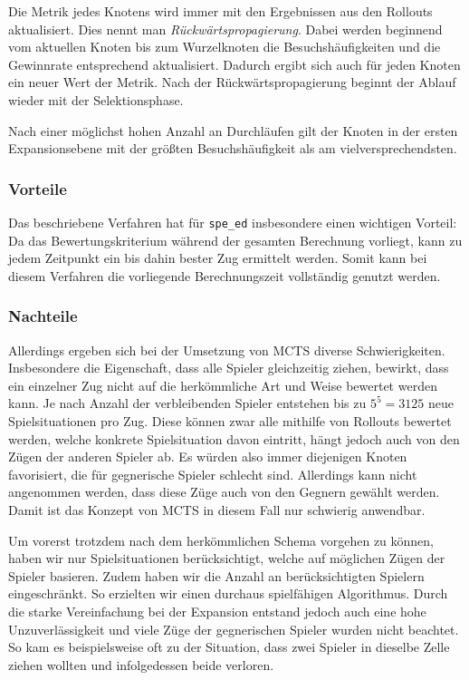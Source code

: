 \documentclass[12pt,a4paper]{article}
\begin{document}
Die Metrik jedes Knotens wird immer mit den Ergebnissen aus den Rollouts aktualisiert. Dies nennt man \textit{Rückwärtspropagierung}. Dabei werden beginnend vom aktuellen Knoten bis zum Wurzelknoten die Besuchshäufigkeiten und die Gewinnrate entsprechend aktualisiert. Dadurch ergibt sich auch für jeden Knoten ein neuer Wert der Metrik. Nach der Rückwärtspropagierung beginnt der Ablauf wieder mit der Selektionsphase.

Nach einer möglichst hohen Anzahl an Durchläufen gilt der Knoten in der ersten Expansionsebene mit der größten Besuchshäufigkeit als am vielversprechendsten.

\subsubsection{Vorteile}
Das beschriebene Verfahren hat für \texttt{spe\_ed} insbesondere einen wichtigen Vorteil: Da das Bewertungskriterium während der gesamten Berechnung vorliegt, kann zu jedem Zeitpunkt ein bis dahin bester Zug ermittelt werden. Somit kann bei diesem Verfahren die vorliegende Berechnungszeit vollständig genutzt werden.

\subsubsection{Nachteile}
Allerdings ergeben sich bei der Umsetzung von MCTS diverse Schwierigkeiten. Insbesondere die Eigenschaft, dass alle Spieler gleichzeitig ziehen, bewirkt, dass ein einzelner Zug nicht auf die herkömmliche Art und Weise bewertet werden kann. Je nach Anzahl der verbleibenden Spieler entstehen bis zu \(5^5 = 3125\) neue Spielsituationen pro Zug. Diese können zwar alle mithilfe von Rollouts bewertet werden, welche konkrete Spielsituation davon eintritt, hängt jedoch auch von den Zügen der anderen Spieler ab. Es würden also immer diejenigen Knoten favorisiert, die für gegnerische Spieler schlecht sind. Allerdings kann nicht angenommen werden, dass diese Züge auch von den Gegnern gewählt werden. Damit ist das Konzept von MCTS in diesem Fall nur schwierig anwendbar.

Um vorerst trotzdem nach dem herkömmlichen Schema vorgehen zu können, haben wir nur Spielsituationen berücksichtigt, welche auf möglichen Zügen der Spieler basieren. Zudem haben wir die Anzahl an berücksichtigten Spielern eingeschränkt. So erzielten wir einen durchaus spielfähigen Algorithmus. Durch die starke Vereinfachung bei der Expansion entstand jedoch auch eine hohe Unzuverlässigkeit und viele Züge der gegnerischen Spieler wurden nicht beachtet. So kam es beispielsweise oft zu der Situation, dass zwei Spieler in dieselbe Zelle ziehen wollten und infolgedessen beide verloren.
\end{document}
